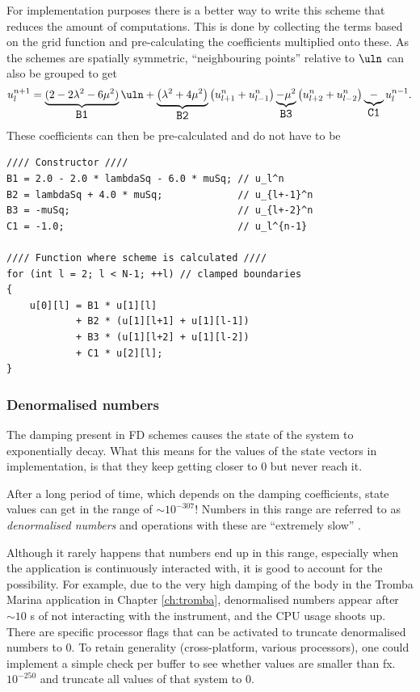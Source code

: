 For implementation purposes there is a better way to write this scheme that reduces the amount of computations. This is done by collecting the terms based on the grid function and pre-calculating the coefficients multiplied onto these. As the schemes are spatially symmetric, ``neighbouring points'' relative to $\uln$ can also be grouped to get
\def\semilarge{\fontsize{11}{11.6}\selectfont}
\begin{equation}
    u_l^{n+1} = \underbrace{(2 - 2\lambda^2 - 6\mu^2)}_{\texttt{\semilarge B1}}\uln  + \underbrace{\left(\lambda^2 + 4\mu^2\right)}_{\texttt{\semilarge B2}}\left(u_{l+1}^n+u_{l-1}^n\right)\underbrace{-\mu^2}_{\texttt{\semilarge B3}} \left(u_{l+2}^n+u_{l-2}^n\right) \underbrace{-}_{\texttt{\semilarge C1}} u_l^{n-1}.
\end{equation}
These coefficients can then be pre-calculated and do not have to be 

\begin{lstlisting}[caption=Precalculation]
//// Constructor ////
B1 = 2.0 - 2.0 * lambdaSq - 6.0 * muSq; // u_l^n
B2 = lambdaSq + 4.0 * muSq;             // u_{l+-1}^n
B3 = -muSq;                             // u_{l+-2}^n
C1 = -1.0;                              // u_l^{n-1}

//// Function where scheme is calculated ////
for (int l = 2; l < N-1; ++l) // clamped boundaries
{
    u[0][l] = B1 * u[1][l]
            + B2 * (u[1][l+1] + u[1][l-1]) 
            + B3 * (u[1][l+2] + u[1][l-2])
            + C1 * u[2][l];
}
\end{lstlisting}

\subsubsection{Denormalised numbers}
The damping present in FD schemes causes the state of the system to exponentially decay. What this means for the values of the state vectors in implementation, is that they keep getting closer to $0$ but never reach it. 

After a long period of time, which depends on the damping coefficients, state values can get in the range of $\sim 10^{-307}$! Numbers in this range are referred to as \textit{denormalised numbers} and operations with these are ``extremely slow'' \cite{CPPdenormalised}.

Although it rarely happens that numbers end up in this range, especially when the application is continuously interacted with, it is good to account for the possibility. For example, due to the very high damping of the body in the Tromba Marina application in Chapter \ref{ch:tromba}, denormalised numbers appear after $\sim 10$ s of not interacting with the instrument, and the CPU usage shoots up. There are specific processor flags that can be activated to truncate denormalised numbers to 0. To retain generality (cross-platform, various processors), one could implement a simple check per buffer to see whether values are smaller than fx. $10^{-250}$ and truncate all values of that system to $0$. 

